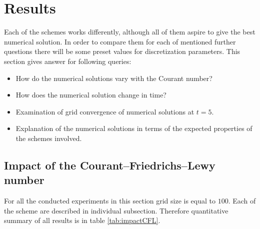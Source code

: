 \section{Results} \label{sec:results}
	Each of the schemes works differently, although all of them aspire to give the best numerical solution. In order to compare them for each of mentioned further questions there will be some preset values for discretization parameters.
	This section gives answer for following queries:
	
	\begin{itemize}
		\item How do the numerical solutions vary with the Courant number?
		\item How does the numerical solution change in time?
		\item Examination of grid convergence of numerical solutions at $t=5$.
		\item Explanation of the numerical solutions in terms of the expected properties of the schemes involved.
	\end{itemize}

	\subsection{Impact of the Courant–Friedrichs–Lewy number} \label{sec:impactCFL}
		For all the conducted experiments in this section grid size is equal to $100$. Each of the scheme are described in individual subsection. Therefore quantitative summary of all results is in table \ref{tab:impactCFL}.
		
		
		
		
		
		
